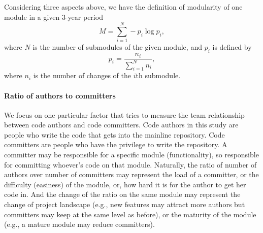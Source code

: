 \documentclass{sig-alternate-05-2015}
\begin{document}
Considering three aspects above, we have the definition of modularity of one module in a given 3-year period
\begin{equation}
\label{def_modularity}
M = \sum\limits_{i=1}^{N} - p_{i} \log p_{i}, 
\end{equation}
where $N$ is the number of submodules of the given module, and $p_{i}$ is defined by
\begin{equation}
\label{def_pi}
p_{i} = \frac{n_{i}}{\sum\limits_{i=1}^{N} n_{i}}, 
\end{equation}
where $n_{i}$ is the number of changes of the $i$th submodule.


\paragraph{Ratio of authors to committers}
We focus on one particular factor that tries to measure the team relationship between
code authors and code committers. Code authors in this study are people who
write the code that gets into the mainline repository. Code committers are
people who have the privilege to write the repository. A committer may be
responsible for a specific module (functionality), so responsible for committing
whoever's code on that module. 
Naturally, the ratio of number of authors over number of committers may represent the load of a committer, or the difficulty (easiness) of the module, or, how hard it is for the author to 
get her code in. And the change of the ratio on the same module may represent
the change of project landscape (e.g., new features may attract more authors but
committers may keep at the same level as before), or the maturity of the module (e.g.,
a mature module may reduce committers). 
\end{document}
